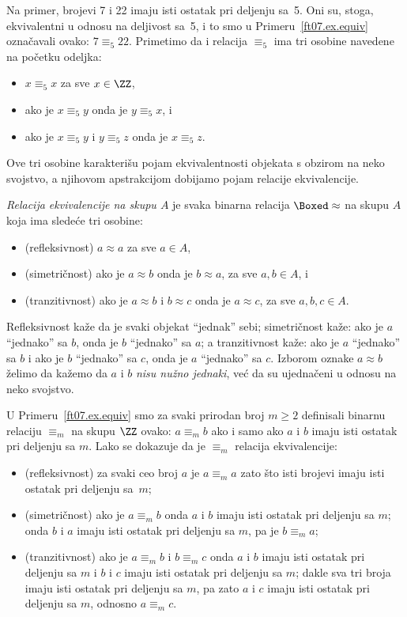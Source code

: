 Na primer, brojevi 7 i 22 imaju isti ostatak pri deljenju sa~5. Oni su, stoga, ekvivalentni u odnosu na
deljivost sa~5, i to smo u Primeru~\ref{ft07.ex.equiv} ozna\v cavali ovako: $7 \equiv_5 22$.
Primetimo da i relacija $\equiv_5$ ima tri osobine navedene na po\v cetku odeljka:
\begin{itemize}\itemsep -1.5pt
\item $x \equiv_5 x$ za sve $x \in \ZZ$,
\item ako je $x \equiv_5 y$ onda je $y \equiv_5 x$, i
\item ako je $x \equiv_5 y$ i $y \equiv_5 z$ onda je $x \equiv_5 z$.
\end{itemize}
Ove tri osobine karakteri\v su pojam ekvivalentnosti objekata s obzirom na neko svojstvo, a njihovom
apstrakcijom dobijamo pojam relacije ekvivalencije.

\emph{Relacija ekvivalencije na skupu $A$} je svaka binarna relacija $\Boxed\approx$ na skupu $A$
koja ima slede\'ce tri osobine:
\begin{itemize}\itemsep -1.5pt
\item
  (refleksivnost) $a \approx a$ za sve $a \in A$,
\item
  (simetri\v cnost) ako je $a \approx b$ onda je $b \approx a$, za sve $a, b \in A$, i
\item
  (tranzitivnost) ako je $a \approx b$ i $b \approx c$ onda je $a \approx c$, za sve $a, b, c \in A$.
\end{itemize}
Refleksivnost ka\v ze da je svaki objekat ``jednak'' sebi; simetri\v cnost ka\v ze: ako je $a$ ``jednako'' sa $b$, onda je
$b$ ``jednako'' sa $a$; a tranzitivnost ka\v ze: ako je $a$ ``jednako'' sa $b$ i ako je $b$ ``jednako'' sa $c$, onda je
$a$ ``jednako'' sa $c$. Izborom oznake $a \approx b$ \v zelimo da ka\v zemo da $a$ i $b$ \emph{nisu nu\v zno jednaki},
ve\'c da su ujedna\v ceni u odnosu na neko svojstvo.

\begin{EX}\label{ft07.ex.equiv2}
  U Primeru~\ref{ft07.ex.equiv} smo za svaki prirodan broj $m \ge 2$ definisali binarnu relaciju $\equiv_m$
  na skupu $\ZZ$ ovako: $a \equiv_m b$ ako i samo ako $a$ i $b$ imaju isti ostatak pri deljenju sa $m$.
  Lako se dokazuje da je $\equiv_m$ relacija ekvivalencije:
  \begin{itemize}
  \item
    (refleksivnost) za svaki ceo broj $a$ je $a \equiv_m a$ zato \v sto isti brojevi imaju isti ostatak pri deljenju sa~$m$;
  \item
    (simetri\v cnost) ako je $a \equiv_m b$ onda $a$ i $b$ imaju isti ostatak pri deljenju sa $m$; onda $b$ i $a$ imaju
    isti ostatak pri deljenju sa $m$, pa je $b \equiv_m a$;
  \item
    (tranzitivnost) ako je $a \equiv_m b$ i $b \equiv_m c$ onda $a$ i $b$ imaju isti ostatak pri deljenju sa $m$ i
    $b$ i $c$ imaju isti ostatak pri deljenju sa $m$; dakle sva tri broja imaju isti ostatak pri deljenju sa $m$, pa zato
    $a$ i $c$ imaju isti ostatak pri deljenju sa $m$, odnosno $a \equiv_m c$.
  \end{itemize}
\end{EX}

